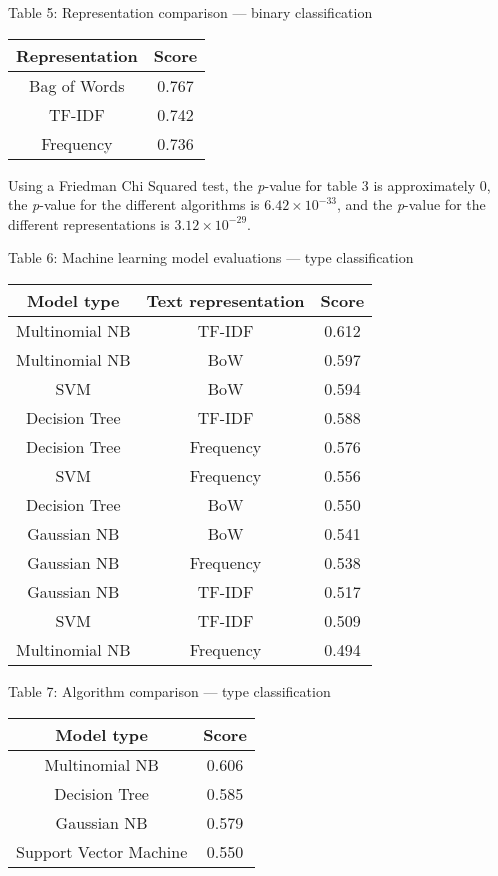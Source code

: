 \documentclass{article}
\begin{document}
\begin{center}
Table 5: Representation comparison --- binary classification\\
\begin{tabular}{ |c|c| }
\hline {\bf Representation}& {\bf Score}\\
\hline Bag of Words & 0.767\\
\hline TF-IDF & 0.742\\
\hline Frequency & 0.736\\
\hline
\end{tabular}
\end{center}

Using a Friedman Chi Squared test, the \emph{p}-value for table 3 is approximately 0, the \emph{p}-value for the different algorithms is $6.42 \times 10^{-33}$, and the \emph{p}-value for the different representations is $3.12 \times 10^{-29}$.

\begin{center}
Table 6: Machine learning model evaluations --- type classification\\
\begin{tabular}{ |c|c|c| }
\hline {\bf Model type} & {\bf Text representation} & {\bf Score} \\
\hline Multinomial NB & TF-IDF & 0.612\\
\hline Multinomial NB & BoW & 0.597\\
\hline SVM & BoW & 0.594\\
\hline Decision Tree & TF-IDF & 0.588\\
\hline Decision Tree & Frequency & 0.576\\
\hline SVM & Frequency & 0.556\\
\hline Decision Tree & BoW & 0.550\\
\hline Gaussian NB & BoW & 0.541\\
\hline Gaussian NB & Frequency & 0.538\\
\hline Gaussian NB & TF-IDF & 0.517\\
\hline SVM & TF-IDF & 0.509\\
\hline Multinomial NB & Frequency & 0.494\\
\hline
\end{tabular}
\end{center}

\begin{center}
Table 7: Algorithm comparison --- type classification\\
\begin{tabular}{ |c|c| }
\hline {\bf Model type}& {\bf Score}\\
\hline Multinomial NB & 0.606\\
\hline Decision Tree & 0.585\\
\hline Gaussian NB & 0.579\\
\hline Support Vector Machine & 0.550\\
\hline
\end{tabular}
\end{center}
\end{document}
